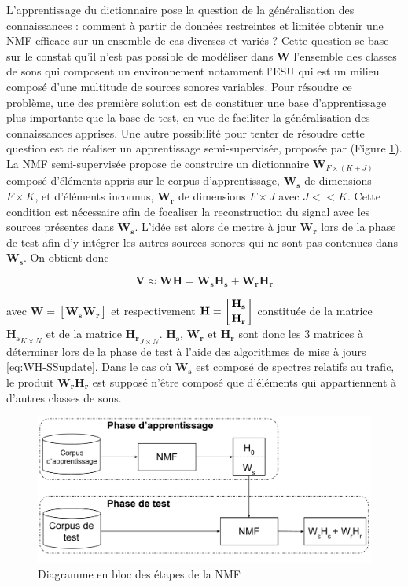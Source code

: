 L'apprentissage du dictionnaire pose la question de la généralisation des connaissances : comment à partir de données restreintes et limitée obtenir une NMF efficace sur un ensemble de cas diverses et variés ?  Cette question se base sur le constat qu'il n'est pas possible de modéliser dans $\mathbf{W}$ l'ensemble des classes de sons qui composent un environnement notamment l'ESU qui est un milieu composé d'une multitude de sources sonores variables. Pour résoudre ce problème, une des première solution est de constituer une base d'apprentissage plus importante que la base de test, en vue de faciliter la généralisation des connaissances apprises.
Une autre possibilité pour tenter de résoudre cette question est de réaliser un apprentissage semi-supervisée, proposée par \cite{lee_semi-supervised_2010, smaragdis2007supervised} (Figure \ref{fig:semi-supervised_learning}). La NMF semi-supervisée propose de construire un dictionnaire $\mathbf{W}_{F \times (K+J)}$ composé d'éléments appris sur le corpus d'apprentissage, $\mathbf{W_s} $ de dimensions $F \times K$, et d'éléments inconnus, $\mathbf{W_r}$ de dimensions $F \times J$ avec $J << K$. Cette condition est nécessaire afin de focaliser la reconstruction du signal avec les sources présentes dans $\mathbf{W_s}$. L'idée est alors de mettre à jour $\mathbf{W_r}$ lors de la phase de test afin d'y intégrer les autres sources sonores qui ne sont pas contenues dans $\mathbf{W_s}$. On obtient donc

\begin{equation}
\mathbf{V} \approx \mathbf{WH} = \mathbf{W_s} \mathbf{H_s} + \mathbf{W_r} \mathbf{H_r}
\end{equation}


avec $\mathbf{W} = \left[ \mathbf{W_s} \mathbf{W_r} \right]$ et respectivement $\mathbf{H} = \left[ \genfrac{}{}{0pt}{0}{\mathbf{H_s}}{\mathbf{H_r}} \right]$ constituée de la matrice $\mathbf{H_s}_{K \times N}$ et de la matrice $\mathbf{H_r}_{J \times N}$. $\mathbf{H_s}$, $\mathbf{W_r}$ et $\mathbf{H_r}$ sont donc les 3 matrices à déterminer lors de la phase de test à l'aide des algorithmes de mise à jours \ref{eq:WH-SSupdate}. Dans le cas où $\mathbf{W_s}$ est composé de spectres relatifs au trafic, le produit $\mathbf{W_r} \mathbf{H_r}$ est supposé n'être composé que d'éléments qui appartiennent à d'autres classes de sons.

\begin{figure}[t]
\centering
\includegraphics[width=.85\linewidth]{./figures/NMF/NMF_semi-supervised.pdf}
\caption{Diagramme en bloc des étapes de la NMF}
\label{fig:semi-supervised_learning}
\end{figure}

